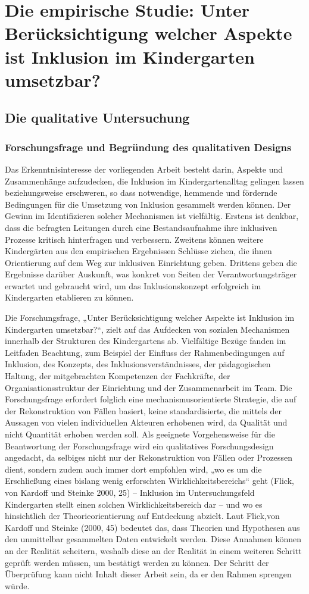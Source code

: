 \part{Die empirische Studie: Unter Berücksichtigung welcher Aspekte ist Inklusion im Kindergarten umsetzbar?}
\chapter{Die qualitative Untersuchung}
\section{Forschungsfrage und Begründung des qualitativen Designs}
Das Erkenntnisinteresse der vorliegenden Arbeit besteht darin, Aspekte und Zusammenhänge aufzudecken, die Inklusion im Kindergartenalltag gelingen lassen beziehungsweise erschweren, so dass notwendige, hemmende und fördernde Bedingungen für die Umsetzung von Inklusion gesammelt werden können. Der Gewinn im Identifizieren solcher Mechanismen ist vielfältig. Erstens ist denkbar, dass die befragten Leitungen durch eine Bestandsaufnahme ihre inklusiven Prozesse kritisch hinterfragen und verbessern. Zweitens können weitere Kindergärten aus den empirischen Ergebnissen Schlüsse ziehen, die ihnen Orientierung auf dem Weg zur inklusiven Einrichtung geben. Drittens geben die Ergebnisse darüber Auskunft, was konkret von Seiten der Verantwortungsträger erwartet und gebraucht wird, um das Inklusionskonzept erfolgreich im Kindergarten etablieren zu können.

Die Forschungsfrage, „Unter Berücksichtigung welcher Aspekte ist Inklusion im Kindergarten umsetzbar?“, zielt auf das Aufdecken von sozialen Mechanismen innerhalb der Strukturen des Kindergartens ab. Vielfältige Bezüge fanden im Leitfaden Beachtung, zum Beispiel der Einfluss der Rahmenbedingungen auf Inklusion, des Konzepts, des Inklusionsverständnisses, der pädagogischen Haltung, der mitgebrachten Kompetenzen der Fachkräfte, der Organisationsstruktur der Einrichtung und der Zusammenarbeit im Team. 
Die Forschungsfrage erfordert folglich eine mechanismusorientierte Strategie, die auf der Rekonstruktion von Fällen basiert, keine  standardisierte, die mittels der Aussagen von vielen individuellen Akteuren erhobenen wird, da Qualität und nicht Quantität erhoben werden soll. Als geeignete Vorgehensweise für die Beantwortung der Forschungsfrage wird ein  
qualitatives Forschungsdesign angedacht, da selbiges nicht nur der Rekonstruktion von Fällen oder Prozessen dient, sondern zudem auch immer dort empfohlen wird, „wo es um die Erschließung eines bislang wenig erforschten Wirklichkeitsbereichs“ geht (Flick, von Kardoff und Steinke 2000, 25) -- Inklusion im Untersuchungsfeld Kindergarten stellt einen solchen Wirklichkeitsbereich dar -- und wo es hinsichtlich der Theorieorientierung auf Entdeckung abzielt.
Laut Flick,von Kardoff und Steinke (2000, 45) bedeutet das, dass Theorien und Hypothesen aus den unmittelbar gesammelten Daten entwickelt werden. Diese Annahmen können an der Realität scheitern, weshalb diese an der Realität in einem weiteren Schritt geprüft werden müssen, um bestätigt werden zu können. Der Schritt der Überprüfung kann nicht Inhalt dieser Arbeit sein, da er den Rahmen sprengen würde.  

